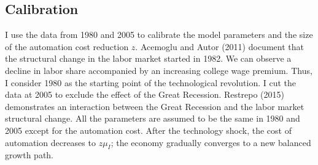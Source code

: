\documentclass[12pt]{article}
\begin{document}
\subsection{Calibration}
I use the data from 1980 and 2005 to calibrate the model parameters and the size of the automation cost reduction $z$. Acemoglu and Autor (2011)\nocite{AcemogluAutor2011} document that the structural change in the labor market started in 1982. We can observe a decline in labor share accompanied by an increasing college wage premium. Thus, I consider 1980 as the starting point of the technological revolution. I cut the data at 2005 to exclude the effect of the Great Recession. Restrepo (2015)\nocite{Restrepo2015} demonstrates an interaction between the Great Recession and the labor market structural change. All the parameters are assumed to be the same in 1980 and 2005 except for the automation cost. After the technology shock, the cost of automation decreases to $z\mu_I$; the economy gradually converges to a new balanced growth path. 
\end{document}
